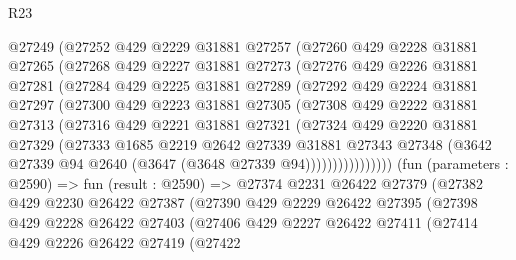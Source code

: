 \begin{lexlean}{R23}
\begin{coremodule}
            @27249
            (@27252
              @429
              @2229
              @31881
              @27257
              (@27260
                @429
                @2228
                @31881
                @27265
                (@27268
                  @429
                  @2227
                  @31881
                  @27273
                  (@27276
                    @429
                    @2226
                    @31881
                    @27281
                    (@27284
                      @429
                      @2225
                      @31881
                      @27289
                      (@27292
                        @429
                        @2224
                        @31881
                        @27297
                        (@27300
                          @429
                          @2223
                          @31881
                          @27305
                          (@27308
                            @429
                            @2222
                            @31881
                            @27313
                            (@27316
                              @429
                              @2221
                              @31881
                              @27321
                              (@27324
                                @429
                                @2220
                                @31881
                                @27329
                                (@27333
                                  @1685
                                  @2219
                                  @2642
                                  @27339
                                  @31881
                                  @27343
                                  @27348
                                  (@3642 @27339 @94 @2640 (@3647 (@3648 @27339 @94))))))))))))))))
        (fun (parameters : @2590) =>
        fun (result : @2590) =>
        @27374
          @2231
          @26422
          @27379
          (@27382
            @429
            @2230
            @26422
            @27387
            (@27390
              @429
              @2229
              @26422
              @27395
              (@27398
                @429
                @2228
                @26422
                @27403
                (@27406
                  @429
                  @2227
                  @26422
                  @27411
                  (@27414
                    @429
                    @2226
                    @26422
                    @27419
                    (@27422

\end{coremodule}
\end{lexlean}
